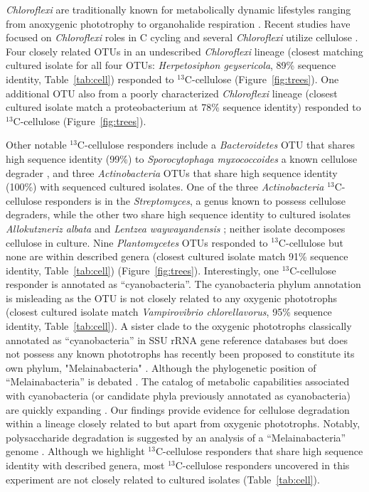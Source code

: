 \textit{Chloroflexi} are traditionally known for metabolically dynamic
lifestyles ranging from anoxygenic phototrophy to organohalide respiration
\citep{Hug_2013}. Recent studies have focused on \textit{Chloroflexi} roles in
C cycling \citep{Hug_2013, Goldfarb_2011,Cole_2013} and several
\textit{Chloroflexi} utilize cellulose \citep{Goldfarb_2011, Cole_2013,
Hug_2013}. Four closely related OTUs in an undescribed \textit{Chloroflexi}
lineage (closest matching cultured isolate for all four OTUs:
\textit{Herpetosiphon geysericola}, 89\% sequence identity,
Table~\ref{tab:cell}) responded to $^{13}$C-cellulose (Figure~\ref{fig:trees}).
One additional OTU also from a poorly characterized \textit{Chloroflexi}
lineage (closest cultured isolate match a proteobacterium at 78\% sequence
identity) responded to $^{13}$C-cellulose (Figure~\ref{fig:trees}).

Other notable $^{13}$C-cellulose responders include a \textit{Bacteroidetes}
OTU that shares high sequence identity (99\%) to \textit{Sporocytophaga
myxococcoides} a known cellulose degrader \citep{Vance_1980}, and three
\textit{Actinobacteria} OTUs that share high sequence identity (100\%) with
sequenced cultured isolates. One of the three \textit{Actinobacteria}
$^{13}$C-cellulose responders is in the \textit{Streptomyces}, a genus known to
possess cellulose degraders, while the other two share high sequence identity
to cultured isolates \textit{Allokutzneriz albata} \citep{Labeda_2008,
Tomita_1993} and \textit{Lentzea waywayandensis} \citep{LABEDA_1989,
Labeda_2001}; neither isolate decomposes cellulose in culture. Nine
\textit{Plantomycetes} OTUs responded to $^{13}$C-cellulose but none are within
described genera (closest cultured isolate match 91\% sequence identity,
Table~\ref{tab:cell}) (Figure~\ref{fig:trees}). Interestingly, one
$^{13}$C-cellulose responder is annotated as ``cyanobacteria''.
The cyanobacteria phylum annotation is misleading as the OTU is not closely
related to any oxygenic phototrophs (closest cultured isolate match
\textit{Vampirovibrio chlorellavorus}, 95\% sequence identity,
Table~\ref{tab:cell}). A sister clade to the oxygenic phototrophs classically
annotated as ``cyanobacteria'' in SSU rRNA gene reference databases but does
not possess any known phototrophs has recently been proposed to constitute its own
phylum, "Melainabacteria" \citet{Di_Rienzi_2013}. Although the phylogenetic
position of ``Melainabacteria'' is debated \citep{Soo_2014}. The catalog of
metabolic capabilities associated with cyanobacteria (or candidate phyla
previously annotated as cyanobacteria) are quickly expanding
\citep{Di_Rienzi_2013, Soo_2014}.  Our findings provide evidence for cellulose
degradation within a lineage closely related to but apart from oxygenic
phototrophs. Notably, polysaccharide degradation is suggested by an analysis of
a ``Melainabacteria'' genome \citep{Di_Rienzi_2013}. Although we highlight
$^{13}$C-cellulose responders that share high sequence identity with described
genera, most $^{13}$C-cellulose responders uncovered in this experiment are not
closely related to cultured isolates (Table~\ref{tab:cell}).

